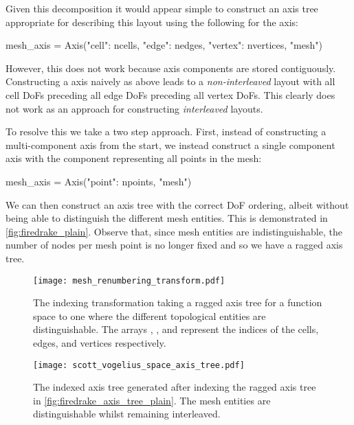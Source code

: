 \documentclass[thesis]{subfiles}
\begin{document}
Given this decomposition it would appear simple to construct an axis tree appropriate for describing this layout using the following for the  axis:
\begin{pyinline}
  mesh_axis = Axis({"cell": ncells,
                    "edge": nedges,
                    "vertex": nvertices}, "mesh")
\end{pyinline}
However, this does not work because axis components are stored contiguously.
Constructing a  axis naively as above leads to a \emph{non-interleaved} layout with all cell DoFs preceding all edge DoFs preceding all vertex DoFs.
This clearly does not work as an approach for constructing \emph{interleaved} layouts.

To resolve this we take a two step approach.
First, instead of constructing a multi-component  axis from the start, we instead construct a single component axis with the component representing all points in the mesh:
\begin{pyinline}
  mesh_axis = Axis({"point": npoints}, "mesh")
\end{pyinline}
We can then construct an axis tree with the correct DoF ordering, albeit without being able to distinguish the different mesh entities.
This is demonstrated in \cref{fig:firedrake_plain}.
Observe that, since mesh entities are indistinguishable, the number of nodes per mesh point is no longer fixed and so we have a ragged axis tree.

\begin{landscape}

\begin{figure}
  \centering
  \texttt{[image: mesh\_renumbering\_transform.pdf]}
  \caption{
    The indexing transformation taking a ragged axis tree for a function space to one where the different topological entities are distinguishable.
    The arrays \pycode{[0,3,...]}, \pycode{[2,...]}, and \pycode{[1,4,...]} represent the indices of the cells, edges, and vertices respectively.
  }
  \label{fig:mesh_renumbering_transform}
\end{figure}

\begin{figure}
  \centering
  \texttt{[image: scott\_vogelius\_space\_axis\_tree.pdf]}
  \caption{
    The indexed axis tree generated after indexing the ragged axis tree in \cref{fig:firedrake_axis_tree_plain}.
    The mesh entities are distinguishable whilst remaining interleaved.
  }
  \label{fig:firedrake_axis_tree}
\end{figure}

\end{landscape}
\end{document}
